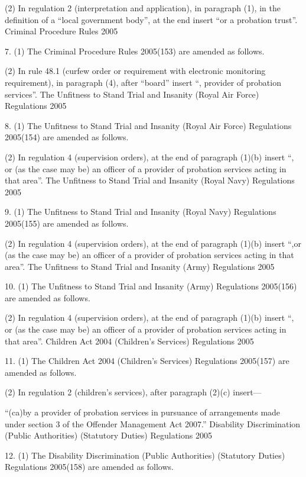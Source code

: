 \documentclass[12pt,a4paper]{article}
\begin{document}
(2) In regulation 2 (interpretation and application), in paragraph (1), in the definition of a “local government body”, at the end insert “or a probation trust”.
Criminal Procedure Rules 2005

7.  (1)  The Criminal Procedure Rules 2005(153) are amended as follows.

(2) In rule 48.1 (curfew order or requirement with electronic monitoring requirement), in paragraph (4), after “board” insert “, provider of probation services”.
The Unfitness to Stand Trial and Insanity (Royal Air Force) Regulations 2005

8.  (1)  The Unfitness to Stand Trial and Insanity (Royal Air Force) Regulations 2005(154) are amended as follows.

(2) In regulation 4 (supervision orders), at the end of paragraph (1)(b) insert “, or (as the case may be) an officer of a provider of probation services acting in that area”.
The Unfitness to Stand Trial and Insanity (Royal Navy) Regulations 2005

9.  (1)  The Unfitness to Stand Trial and Insanity (Royal Navy) Regulations 2005(155) are amended as follows.

(2) In regulation 4 (supervision orders), at the end of paragraph (1)(b) insert “,or (as the case may be) an officer of a provider of probation services acting in that area”.
The Unfitness to Stand Trial and Insanity (Army) Regulations 2005

10.  (1)  The Unfitness to Stand Trial and Insanity (Army) Regulations 2005(156) are amended as follows.

(2) In regulation 4 (supervision orders), at the end of paragraph (1)(b) insert “, or (as the case may be) an officer of a provider of probation services acting in that area”.
Children Act 2004 (Children’s Services) Regulations 2005

11.  (1)  The Children Act 2004 (Children’s Services) Regulations 2005(157) are amended as follows.

(2) In regulation 2 (children’s services), after paragraph (2)(c) insert—

“(ca)by a provider of probation services in pursuance of arrangements made under section 3 of the Offender Management Act 2007.”
Disability Discrimination (Public Authorities) (Statutory Duties) Regulations 2005

12.  (1)  The Disability Discrimination (Public Authorities) (Statutory Duties) Regulations 2005(158) are amended as follows.
\end{document}
